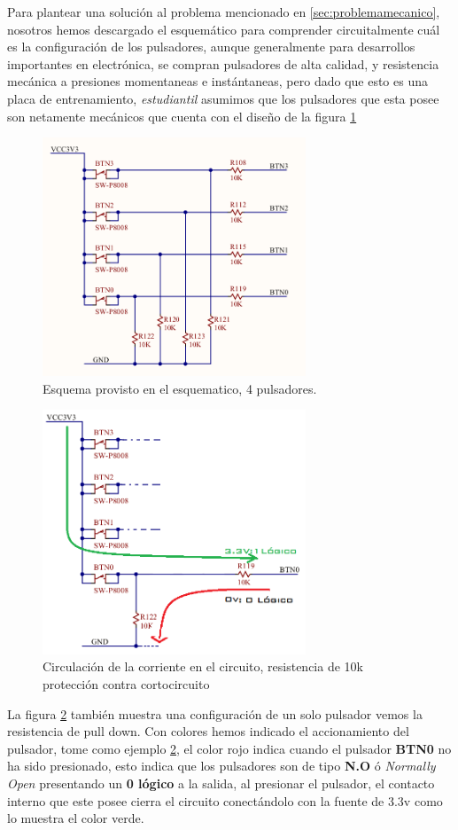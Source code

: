 \documentclass[paper=a4, fontsize=12pt]{article} 		%
\numberwithin{equation}{section}						%
\numberwithin{figure}{section} 							%
\numberwithin{table}{section} 							%
\begin{document}
Para plantear una solución al problema mencionado en \ref{sec:problemamecanico}, nosotros hemos descargado el esquemático para comprender circuitalmente cuál es la configuración de los pulsadores, aunque generalmente para desarrollos importantes en electrónica, se compran  pulsadores de alta calidad, y resistencia mecánica a presiones momentaneas e instántaneas, pero dado que esto es una placa de entrenamiento, \textit{estudiantil} asumimos que los pulsadores que esta posee son netamente mecánicos que cuenta con el diseño de la figura \ref{fig:btn}

\begin{figure}[!ht]
  \centering
     \includegraphics[width=0.7\textwidth]{btn1.png}
  \caption{Esquema provisto en el esquematico, 4 pulsadores.}
    \label{fig:btn}
\end{figure}

\begin{figure}[!ht]
  \centering
     \includegraphics[width=0.7\textwidth]{btn2.png}
  \caption{Circulación de la corriente en el circuito, resistencia de 10k protección contra cortocircuito}
      \label{fig:btn2}
\end{figure}
La figura \ref{fig:btn2} también muestra una configuración de un solo pulsador vemos la resistencia de pull down. Con colores hemos indicado el accionamiento del pulsador, tome como ejemplo \ref{fig:btn2}, el color rojo indica cuando el pulsador \textbf{BTN0} no ha sido presionado, esto indica que los pulsadores son de tipo \textbf{N.O} ó \textit{Normally Open} presentando un \textbf{0 lógico} a la salida, al presionar el pulsador, el contacto interno que este posee cierra el circuito conectándolo con la fuente de 3.3v como lo muestra el color verde.
\end{document}
